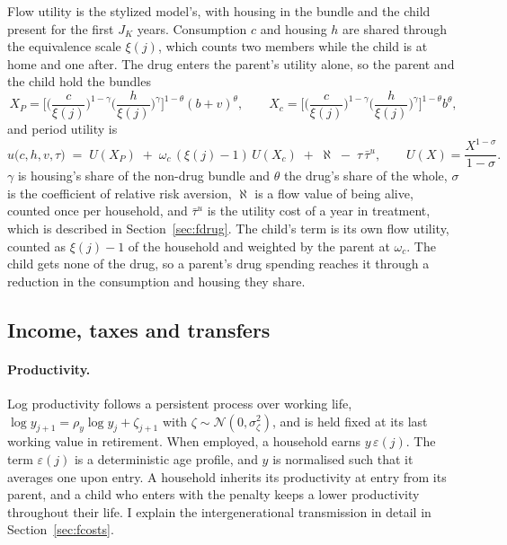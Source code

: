 \documentclass[10pt]{article}
\begin{document}
Flow utility is the stylized model's, with housing in the bundle and the child present for the first $J_K$
years. Consumption $c$ and housing $h$ are shared through the equivalence scale $\xi(j)$, which counts two members while the child is at home and one
after. The drug enters the parent's utility alone, so the parent and the child hold the bundles
\begin{equation}\label{eq:fbundles}
X_P=\Big[\Big(\frac{c}{\xi(j)}\Big)^{1-\gamma}\Big(\frac{h}{\xi(j)}\Big)^{\gamma}\Big]^{1-\theta}(b+v)^{\theta},
\qquad
X_c=\Big[\Big(\frac{c}{\xi(j)}\Big)^{1-\gamma}\Big(\frac{h}{\xi(j)}\Big)^{\gamma}\Big]^{1-\theta}b^{\theta},
\end{equation}
and period utility is
\begin{equation}\label{eq:futil}
u\big(c,h,v,\tau\big) \;=\; U(X_P)\;+\;\omega_c\,(\xi(j)-1)\,U(X_c)\;+\;\aleph\;-\;\tau\,\bar\tau^{u},
\qquad U(X)=\frac{X^{1-\sigma}}{1-\sigma}.
\end{equation}
$\gamma$ is housing's share of the non-drug bundle and $\theta$ the drug's share of
the whole, $\sigma$ is the coefficient of relative risk aversion, $\aleph$ is a flow value of being alive, counted once per household, and $\bar\tau^{u}$ is the utility
cost of a year in treatment, which is described in Section~\ref{sec:fdrug}. The child's term is its own flow utility, counted as $\xi(j)-1$ of the household and weighted by the parent at $\omega_c$. The child gets none of the drug, so a parent's drug spending reaches it through a reduction in the consumption and housing they share.

\subsection{Income, taxes and transfers}\label{sec:ftaxes}

\paragraph{Productivity.} Log productivity follows a persistent process over
working life, $\log y_{j+1}=\rho_y\log y_j+\zeta_{j+1}$ with $\zeta\sim\mathcal N(0,\sigma_\zeta^2)$, and is held fixed at its last working value in retirement.   When employed, a household earns $y\,\varepsilon(j)$. The term $\varepsilon(j)$ is a deterministic age profile, and $y$ is normalised such that it averages one upon entry. A household inherits its productivity at entry from its parent, and a child who enters with the penalty keeps a lower productivity throughout their life. I explain the intergenerational transmission in detail in Section~\ref{sec:fcosts}.
\end{document}
